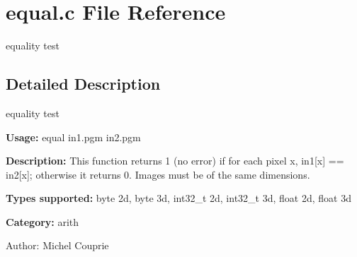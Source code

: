 \section{equal.c File Reference}
\label{equal_8c}
equality test  




\label{_details}
\subsection{Detailed Description}
equality test 

{\bf Usage:} equal in1.pgm in2.pgm

{\bf Description:} This function returns 1 (no error) if for each pixel x, in1[x] == in2[x]; otherwise it returns 0. Images must be of the same dimensions.

{\bf Types supported:} byte 2d, byte 3d, int32\_\-t 2d, int32\_\-t 3d, float 2d, float 3d

{\bf Category:} arith

\begin{Desc}
\item[Author:]Michel Couprie \end{Desc}
